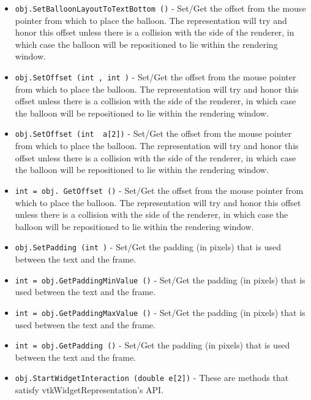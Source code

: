 \begin{itemize}
\item  \verb|obj.SetBalloonLayoutToTextBottom ()| -  Set/Get the offset from the mouse pointer from which to place the
 balloon. The representation will try and honor this offset unless there
 is a collision with the side of the renderer, in which case the balloon 
 will be repositioned to lie within the rendering window.

\item  \verb|obj.SetOffset (int , int )| -  Set/Get the offset from the mouse pointer from which to place the
 balloon. The representation will try and honor this offset unless there
 is a collision with the side of the renderer, in which case the balloon 
 will be repositioned to lie within the rendering window.

\item  \verb|obj.SetOffset (int  a[2])| -  Set/Get the offset from the mouse pointer from which to place the
 balloon. The representation will try and honor this offset unless there
 is a collision with the side of the renderer, in which case the balloon 
 will be repositioned to lie within the rendering window.

\item  \verb|int = obj. GetOffset ()| -  Set/Get the offset from the mouse pointer from which to place the
 balloon. The representation will try and honor this offset unless there
 is a collision with the side of the renderer, in which case the balloon 
 will be repositioned to lie within the rendering window.

\item  \verb|obj.SetPadding (int )| -  Set/Get the padding (in pixels) that is used between the text and the
 frame.

\item  \verb|int = obj.GetPaddingMinValue ()| -  Set/Get the padding (in pixels) that is used between the text and the
 frame.

\item  \verb|int = obj.GetPaddingMaxValue ()| -  Set/Get the padding (in pixels) that is used between the text and the
 frame.

\item  \verb|int = obj.GetPadding ()| -  Set/Get the padding (in pixels) that is used between the text and the
 frame.

\item  \verb|obj.StartWidgetInteraction (double e[2])| -  These are methods that satisfy vtkWidgetRepresentation's API.


\end{itemize}

